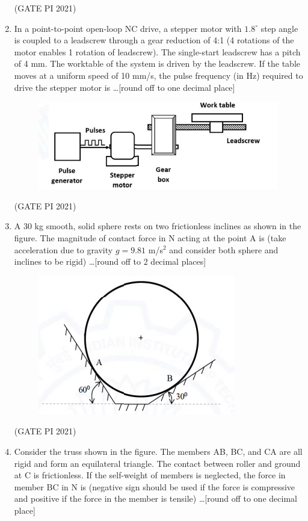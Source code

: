\documentclass[journal,12pt,onecolumn]{IEEEtran}
\theoremstyle{remark}
\begin{document}
\begin{enumerate}
\hfill (GATE PI 2021)

\item
In a point-to-point open-loop NC drive, a stepper motor with $1.8^\circ$ step angle is coupled to a leadscrew through a gear reduction of 4:1 (4 rotations of the motor enables 1 rotation of leadscrew). The single-start leadscrew has a pitch of 4 mm. The worktable of the system is driven by the leadscrew. If the table moves at a uniform speed of 10 mm/s, the pulse frequency (in Hz) required to drive the stepper motor is \ldots [round off to one decimal place]

\begin{figure}[H]
    \centering
    \includegraphics[width=0.5\columnwidth]{figs/fig7.png}
    \caption{}
    \label{fig:placeholder}
\end{figure} 

\hfill (GATE PI 2021)

\item
A 30 kg smooth, solid sphere rests on two frictionless inclines as shown in the figure. The magnitude of contact force in N acting at the point A is (take acceleration due to gravity $g = 9.81$ m/s$^2$ and consider both sphere and inclines to be rigid) \ldots [round off to 2 decimal places]

\begin{figure}[H]
    \centering
    \includegraphics[width=0.5\columnwidth]{figs/fig8.png}
    \caption{}
    \label{fig:placeholder}
\end{figure} 

\hfill (GATE PI 2021)

\item
Consider the truss shown in the figure. The members AB, BC, and CA are all rigid and form an equilateral triangle. The contact between roller and ground at C is frictionless. If the self-weight of members is neglected, the force in member BC in N is (negative sign should be used if the force is compressive and positive if the force in the member is tensile) \ldots [round off to one decimal place]


\end{enumerate}
\end{document}
